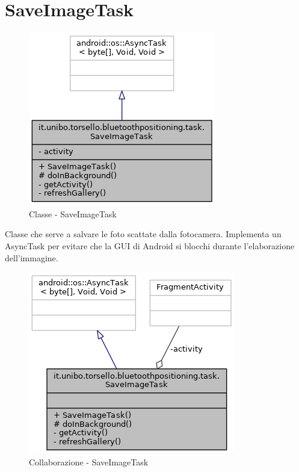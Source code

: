 \newpage
\section{SaveImageTask}
\begin{figure}[ph]
	\centering
	\includegraphics[width=0.5\linewidth]{img/uml/class/classit_1_1unibo_1_1torsello_1_1bluetoothpositioning_1_1task_1_1SaveImageTask__inherit__graph.png}
	\caption{Classe - SaveImageTask}
\end{figure}

Classe che serve a salvare le foto scattate dalla fotocamera. Implementa un AsyncTask per evitare che la GUI di Android si blocchi durante l'elaborazione dell'immagine.

\begin{figure}[ph]
	\centering
	\includegraphics[width=0.5\linewidth]{img/uml/class/classit_1_1unibo_1_1torsello_1_1bluetoothpositioning_1_1task_1_1SaveImageTask__coll__graph.png}
	\caption{Collaborazione - SaveImageTask}
\end{figure}

\newpage
